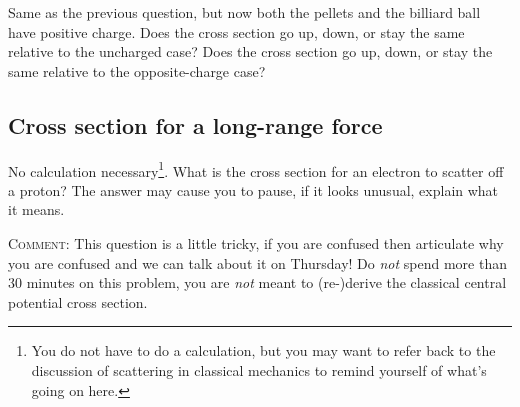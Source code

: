 \documentclass[12pt]{article}
\numberwithin{equation}{section}    %
\begin{document}
Same as the previous question, but now both the pellets and the billiard ball have positive charge. Does the cross section go up, down, or stay the same relative to the uncharged case? Does the cross section go up, down, or stay the same relative to the opposite-charge case?

\subsection{Cross section for a long-range force}

No calculation necessary\footnote{You do not have to do a calculation, but you may want to refer back to the discussion of scattering in classical mechanics to remind yourself of what's going on here.}. What is the cross section for an electron to scatter off a proton? The answer may cause you to pause, if it looks unusual, explain what it means. 


\textsc{Comment:} This question is a little tricky, if you are confused then articulate why you are confused and we can talk about it on Thursday! Do \emph{not} spend more than 30 minutes on this problem, you are \emph{not} meant to (re-)derive the classical central potential cross section.
\end{document}
